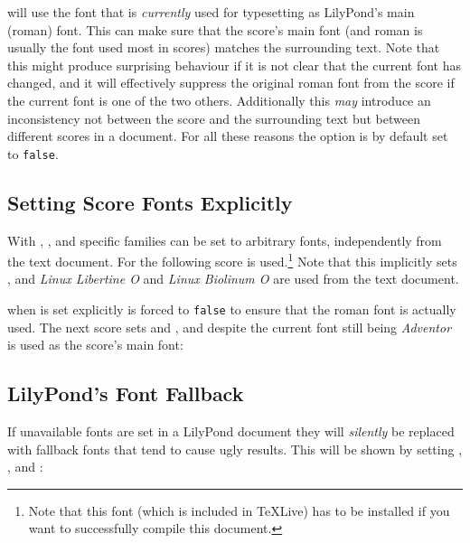 \documentclass{lyluatexexample}
\begin{document}
\bigskip

\sffamily {} will use the font that is
\emph{currently} used for typesetting as LilyPond's main (roman) font. This can
make sure that the score's main font (and roman is usually the font used most in
scores) matches the surrounding text. Note that this might produce surprising
behaviour if it is not clear that the current font has changed, and it will
effectively suppress the original roman font from the score if the current font
is one of the two others. Additionally this \emph{may} introduce an
inconsistency not between the score and the surrounding text but between
different scores in a document. For all these reasons the option is by default
set to \texttt{false}.

\bigskip
{}

\subsection*{Setting Score Fonts Explicitly}

With , , and  specific
families can be set to arbitrary fonts, independently from the text document.
For the following score  is
used.\footnote{Note that this font (which is included in TeXLive) has to be
installed if you want to successfully compile this document.} Note that this
implicitly sets , and \emph{Linux Libertine O} and
\emph{Linux Biolinum O} are used from the text document.

\bigskip
{}

 when  is set explicitly
 is forced to \texttt{false} to ensure that the
roman font is actually used. The next score sets  and , and despite the current font still being 
\emph{Adventor} is used as the score's main font:

\bigskip
{}

\subsection*{LilyPond's Font Fallback}

If unavailable fonts are set in a LilyPond document they will \emph{silently} be
replaced with fallback fonts that tend to cause ugly results. This will be shown
by setting , ,
and :
\end{document}
